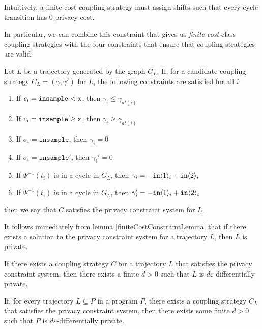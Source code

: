 Intuitively, a finite-cost coupling strategy must assign shifts such that every cycle transition has 0 privacy cost. 

In particular, we can combine this constraint that gives us \textit{finite cost} class coupling strategies with the four constraints that ensure that coupling strategies are valid. 

\begin{defn}\label{privacyConstraintSystem}
    Let $L$ be a trajectory generated by the graph $G_L$. If, for a candidate coupling strategy $C_L = (\gamma, \gamma')$ for $L$, the following constraints are satisfied for all $i$: \begin{enumerate}
        \item If $c_i = \lguard[\texttt{x}]$, then $\gamma_i\leq\gamma_{at(i)}$
        \item If $c_i = \gguard[\texttt{x}]$, then $\gamma_i\geq\gamma_{at(i)}$
        \item If $\sigma_i = \texttt{insample}$, then $\gamma_i=0$
        \item If $\sigma_i = \texttt{insample}'$, then $\gamma_i'=0$
        \item If $\Psi^{-1}(t_i)$ is in a cycle in $G_L$, then $\gamma_i = -\texttt{in}\brangle{1}_i+\texttt{in}\brangle{2}_i$
        \item If $\Psi^{-1}(t_i)$ is in a cycle in $G_L$, then $\gamma_i' = -\texttt{in}\brangle{1}_i+\texttt{in}\brangle{2}_i$
    \end{enumerate}
    then we say that $C$ satisfies the privacy constraint system for $L$. 
\end{defn}

It follows immediately from lemma \ref{finiteCostConstraintLemma} that if there exists a solution to the privacy constraint system for a trajectory $L$, then $L$ is private.

\begin{prop}\label{privacyFiniteCostProp}
    If there exists a coupling strategy $C$ for a trajectory $L$ that satisfies the privacy constraint system, then there exists a finite $d>0$ such that $L$ is $d\varepsilon$-differentially private. 
\end{prop}

\begin{cor}\label{svProgramPrivacyCorollary}
    If, for every trajectory $L\subseteq P$ in a program $P$, there exists a coupling strategy $C_L$ that satisfies the privacy constraint system, then there exists some finite $d>0$ such that $P$ is $d\varepsilon$-differentially private.    
\end{cor}


